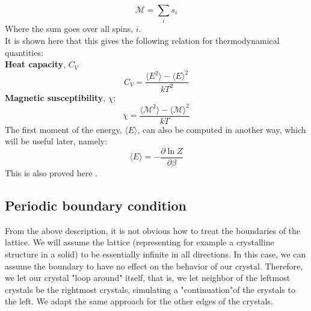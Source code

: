 \documentclass[a4paper, 10pt]{article}
\begin{document}
\begin{equation}
\mathcal{M}=\sum_i s_i
\end{equation}
Where the sum goes over all spins, $i$.\\
\linebreak
It is shown here \cite{AMS} that this  gives the following relation for thermodynamical quantities:\\
\textbf{Heat capacity}, $C_V$\\
\begin{equation}\label{eq:heat_capacity}
C_V=\frac{\langle E^2\rangle - \langle E \rangle^2}{kT^2}
\end{equation}
\textbf{Magnetic susceptibility}, $\chi$:
\begin{equation}\label{eq:magnetic_susp}
\chi=\frac{\langle \mathcal{M}^2\rangle - \langle \mathcal{M} \rangle^2}{kT}
\end{equation}
The first moment of the energy, $\langle E \rangle$, can also be computed in another way, which will be useful later, namely:
\begin{equation}
\langle E \rangle = -\frac{\partial \ln Z}{\partial \beta}
\end{equation}
This is also proved here \cite{AMS}.
\subsection{Periodic boundary condition}
From the above description, it is not obvious how to treat the boundaries of the lattice. We will assume the  lattice (representing for example a crystalline structure in a solid) to be essentially infinite in all directions. In this case, we can assume the boundary to have no effect on the behavior of our crystal. Therefore, we let our crystal "loop around" itself, that is, we let neighbor of the leftmost crystals be the rightmost crystals, simulating a "continuation"of the crystals to the left. We adapt the same approach for the other edges of the crystals.
\end{document}
